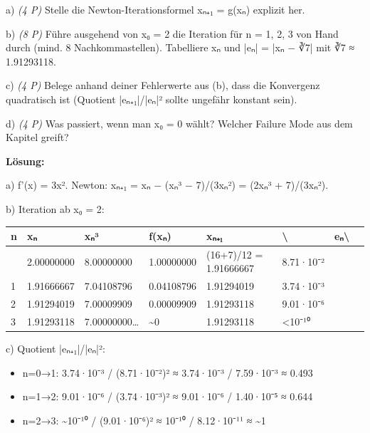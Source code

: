 \documentclass[11pt, a4paper]{article}
\begin{document}
a) \textit{(4 P)} Stelle die Newton-Iterationsformel xₙ₊₁ = g(xₙ) explizit her.


b) \textit{(8 P)} Führe ausgehend von x₀ = 2 die Iteration für n = 1, 2, 3 von Hand durch (mind. 8 Nachkommastellen). Tabelliere xₙ und |eₙ| = |xₙ − ∛7| mit ∛7 ≈ 1.91293118.


c) \textit{(4 P)} Belege anhand deiner Fehlerwerte aus (b), dass die Konvergenz quadratisch ist (Quotient |eₙ₊₁|/|eₙ|² sollte ungefähr konstant sein).


d) \textit{(4 P)} Was passiert, wenn man x₀ = 0 wählt? Welcher Failure Mode aus dem Kapitel greift?


\textbf{Lösung:}


a) f'(x) = 3x². Newton: xₙ₊₁ = xₙ − (xₙ³ − 7)/(3xₙ²) = (2xₙ³ + 7)/(3xₙ²).


b) Iteration ab x₀ = 2:



\begin{landscape}

{\footnotesize
\begin{tabularx}{\linewidth}{XXXXXXXX}
\hline
\rowcolor{tableheadbg}
{\color{white}\textbf{n}} & {\color{white}\textbf{xₙ}} & {\color{white}\textbf{xₙ³}} & {\color{white}\textbf{f(xₙ)}} & {\color{white}\textbf{xₙ₊₁}} & {\color{white}\textbf{\textbackslash{}}} & {\color{white}\textbf{eₙ\textbackslash{}}} & {\color{white}\textbf{}} \\[2pt]
\hline
\endhead
\hline
\endfoot
0 & 2.00000000 & 8.00000000 & 1.00000000 & (16+7)/12 = 1.91666667 & 8.71·10⁻² &  &  \\
1 & 1.91666667 & 7.04108796 & 0.04108796 & 1.91294019 & 3.74·10⁻³ &  &  \\
2 & 1.91294019 & 7.00009909 & 0.00009909 & 1.91293118 & 9.01·10⁻⁶ &  &  \\
3 & 1.91293118 & 7.00000000… & \textasciitilde{}0 & 1.91293118 & <10⁻¹⁰ &  &  \\
\end{tabularx}
}
\end{landscape}


c) Quotient |eₙ₊₁|/|eₙ|²:

\begin{itemize}
  \item n=0→1: 3.74·10⁻³ / (8.71·10⁻²)² ≈ 3.74·10⁻³ / 7.59·10⁻³ ≈ 0.493
  \item n=1→2: 9.01·10⁻⁶ / (3.74·10⁻³)² ≈ 9.01·10⁻⁶ / 1.40·10⁻⁵ ≈ 0.644
  \item n=2→3: \textasciitilde{}10⁻¹⁰ / (9.01·10⁻⁶)² ≈ 10⁻¹⁰ / 8.12·10⁻¹¹ ≈ \textasciitilde{}1
\end{itemize}
\end{document}
